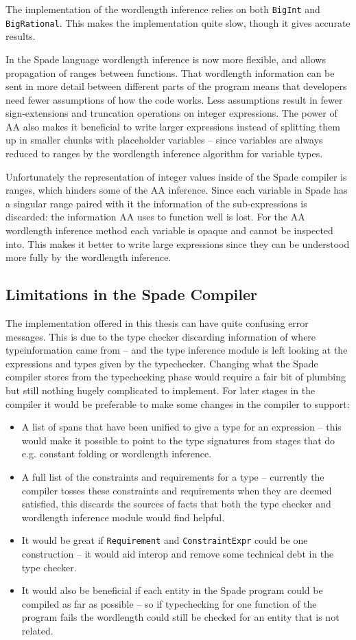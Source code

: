 The implementation of the wordlength inference relies on both \verb+BigInt+ and \verb+BigRational+. This makes the implementation quite slow, though it gives accurate results.

In the Spade language wordlength inference is now more flexible, and allows propagation of ranges between functions. That wordlength information can be sent in more detail between different parts of the program means that developers need fewer assumptions of how the code works. Less assumptions result in fewer sign-extensions and truncation operations on integer expressions. The power of AA also makes it beneficial to write larger expressions instead of splitting them up in smaller chunks with placeholder variables -- since variables are always reduced to ranges by the wordlength inference algorithm for variable types.

Unfortunately the representation of integer values inside of the Spade compiler is ranges, which hinders some of the AA inference. Since each variable in Spade has a singular range paired with it the information of the sub-expressions is discarded: the information AA uses to function well is lost. For the AA wordlength inference method each variable is opaque and cannot be inspected into. This makes it better to write large expressions since they can be understood more fully by the wordlength inference.

\subsection{Limitations in the Spade Compiler}
The implementation offered in this thesis can have quite confusing error messages. This is due to the type checker discarding information of where typeinformation came from -- and the type inference module is left looking at the expressions and types given by the typechecker. Changing what the Spade compiler stores from the typechecking phase would require a fair bit of plumbing but still nothing hugely complicated to implement. For later stages in the compiler it would be preferable to make some changes in the compiler to support:
\begin{itemize}
  \item A list of spans that have been unified to give a type for an expression -- this would make it possible to point to the type signatures from stages that do e.g. constant folding or wordlength inference.
  \item A full list of the constraints and requirements for a type -- currently the compiler tosses these constraints and requirements when they are deemed satisfied, this discards the sources of facts that both the type checker and wordlength inference module would find helpful.
  \item It would be great if \verb+Requirement+ and \verb+ConstraintExpr+ could be one construction -- it would aid interop and remove some technical debt in the type checker.
  \item It would also be beneficial if each entity in the Spade program could be compiled as far as possible -- so if typechecking for one function of the program fails the wordlength could still be checked for an entity that is not related.
\end{itemize}

